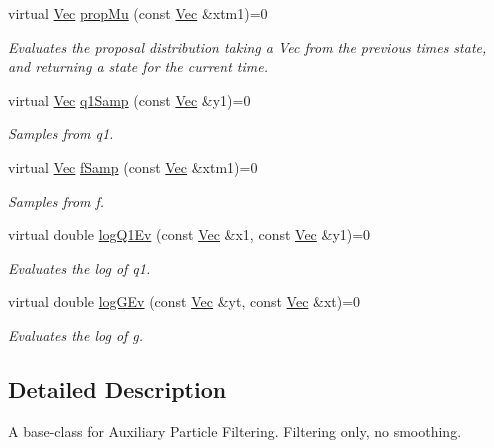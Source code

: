 \begin{DoxyCompactItemize}
virtual \hyperlink{apf__filter_8h_a4c7df05c6f5e8a0d15ae14bcdbc07152}{Vec} \hyperlink{classAPFFilter_a2c136104f4d96e6481406ef1397ead51}{prop\+Mu} (const \hyperlink{apf__filter_8h_a4c7df05c6f5e8a0d15ae14bcdbc07152}{Vec} \&xtm1)=0
\begin{DoxyCompactList}\small\item\em Evaluates the proposal distribution taking a Vec from the previous time\textquotesingle{}s state, and returning a state for the current time. \end{DoxyCompactList}\item 
virtual \hyperlink{apf__filter_8h_a4c7df05c6f5e8a0d15ae14bcdbc07152}{Vec} \hyperlink{classAPFFilter_a017be49a493263156ae60ccc424f7daa}{q1\+Samp} (const \hyperlink{apf__filter_8h_a4c7df05c6f5e8a0d15ae14bcdbc07152}{Vec} \&y1)=0
\begin{DoxyCompactList}\small\item\em Samples from q1. \end{DoxyCompactList}\item 
virtual \hyperlink{apf__filter_8h_a4c7df05c6f5e8a0d15ae14bcdbc07152}{Vec} \hyperlink{classAPFFilter_a367c77209129a84f3d64ff3bcaaac513}{f\+Samp} (const \hyperlink{apf__filter_8h_a4c7df05c6f5e8a0d15ae14bcdbc07152}{Vec} \&xtm1)=0
\begin{DoxyCompactList}\small\item\em Samples from f. \end{DoxyCompactList}\item 
virtual double \hyperlink{classAPFFilter_a18ba363183c0c92e6c58d6f3faccbea7}{log\+Q1\+Ev} (const \hyperlink{apf__filter_8h_a4c7df05c6f5e8a0d15ae14bcdbc07152}{Vec} \&x1, const \hyperlink{apf__filter_8h_a4c7df05c6f5e8a0d15ae14bcdbc07152}{Vec} \&y1)=0
\begin{DoxyCompactList}\small\item\em Evaluates the log of q1. \end{DoxyCompactList}\item 
virtual double \hyperlink{classAPFFilter_ac2d0b5329d7ae123ae4de5dddefb5591}{log\+G\+Ev} (const \hyperlink{apf__filter_8h_a4c7df05c6f5e8a0d15ae14bcdbc07152}{Vec} \&yt, const \hyperlink{apf__filter_8h_a4c7df05c6f5e8a0d15ae14bcdbc07152}{Vec} \&xt)=0
\begin{DoxyCompactList}\small\item\em Evaluates the log of g. \end{DoxyCompactList}\end{DoxyCompactItemize}


\subsection{Detailed Description}
A base-\/class for Auxiliary Particle Filtering. Filtering only, no smoothing. 


